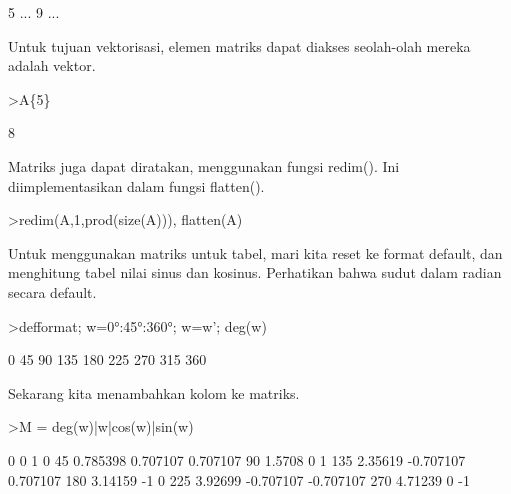 \documentclass[a4paper,10pt]{article}
\begin{document}
\begin{eulernotebook}
\begin{eulercomment}
\begin{eulercomment}
\begin{eulercomment}
\begin{eulercomment}
\begin{euleroutput}
                        5     ...
                        9     ...
\end{euleroutput}
\begin{eulercomment}
Untuk tujuan vektorisasi, elemen matriks dapat diakses seolah-olah
mereka adalah vektor.
\end{eulercomment}
\begin{eulerprompt}
>A\{5\}
\end{eulerprompt}
\begin{euleroutput}
  8
\end{euleroutput}
\begin{eulercomment}
Matriks juga dapat diratakan, menggunakan fungsi redim(). Ini
diimplementasikan dalam fungsi flatten().
\end{eulercomment}
\begin{eulerprompt}
>redim(A,1,prod(size(A))), flatten(A)
\end{eulerprompt}
\begin{euleroutput}
  [4,  5,  6,  7,  8,  9,  10,  11]
  [4,  5,  6,  7,  8,  9,  10,  11]
\end{euleroutput}
\begin{eulercomment}
Untuk menggunakan matriks untuk tabel, mari kita reset ke format
default, dan menghitung tabel nilai sinus dan kosinus. Perhatikan
bahwa sudut dalam radian secara default.
\end{eulercomment}
\begin{eulerprompt}
>defformat; w=0°:45°:360°; w=w'; deg(w)
\end{eulerprompt}
\begin{euleroutput}
              0 
             45 
             90 
            135 
            180 
            225 
            270 
            315 
            360 
\end{euleroutput}
\begin{eulercomment}
Sekarang kita menambahkan kolom ke matriks.
\end{eulercomment}
\begin{eulerprompt}
>M = deg(w)|w|cos(w)|sin(w)
\end{eulerprompt}
\begin{euleroutput}
              0             0             1             0 
             45      0.785398      0.707107      0.707107 
             90        1.5708             0             1 
            135       2.35619     -0.707107      0.707107 
            180       3.14159            -1             0 
            225       3.92699     -0.707107     -0.707107 
            270       4.71239             0            -1 

\end{euleroutput}
\end{eulercomment}
\end{eulercomment}
\end{eulercomment}
\end{eulercomment}
\end{eulernotebook}
\end{document}

